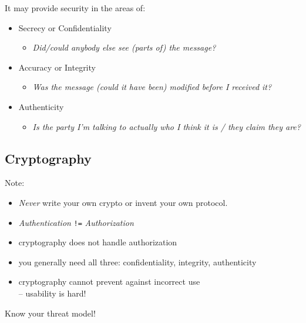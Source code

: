 \documentclass[xga]{xdvislides}
\begin{document}
It may provide security in the areas of:
\begin{itemize}
	\item Secrecy or Confidentiality
		\begin{itemize}
			\item {\em Did/could anybody else see (parts of) the message?}
		\end{itemize}
	\item Accuracy or Integrity
		\begin{itemize}
			\item {\em Was the message (could it have been) modified before I received it?}
		\end{itemize}
	\item Authenticity
		\begin{itemize}
			\item {\em Is the party I'm talking to actually
who I think it is / they claim they are?}
		\end{itemize}
\end{itemize}

\subsection{Cryptography}
Note:
\begin{itemize}
	\item {\em Never} write your own crypto or invent your own protocol.
	\item {\em Authentication} \verb+!=+ {\em Authorization}
	\item cryptography does not handle authorization
	\item you generally need all three: confidentiality, integrity, authenticity
	\item cryptography cannot prevent against incorrect use \\
		-- usability is hard!
\end{itemize}
\addvspace{.5in}
Know your threat model!
\end{document}
